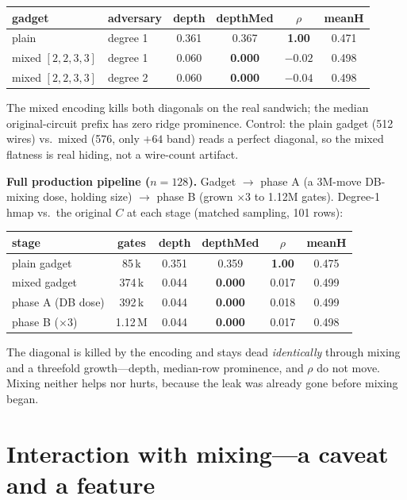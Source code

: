 \documentclass[11pt]{article}
\begin{document}
\begin{center}
\begin{tabular}{llcccc}
\toprule
gadget & adversary & depth & depthMed & $\rho$ & meanH \\
\midrule
plain & degree 1 & 0.361 & 0.367 & \textbf{1.00} & 0.471 \\
mixed $[2,2,3,3]$ & degree 1 & 0.060 & \textbf{0.000} & \textbf{$-0.02$} & 0.498 \\
mixed $[2,2,3,3]$ & degree 2 & 0.060 & \textbf{0.000} & \textbf{$-0.04$} & 0.498 \\
\bottomrule
\end{tabular}
\end{center}

\noindent The mixed encoding kills both diagonals on the real sandwich; the
median original-circuit prefix has zero ridge prominence. Control: the plain
gadget (512 wires) vs.\ mixed (576, only $+64$ band) reads a perfect diagonal, so
the mixed flatness is real hiding, not a wire-count artifact.

\textbf{Full production pipeline ($n=128$).} Gadget $\to$ phase A (a 3M-move
DB-mixing dose, holding size) $\to$ phase B (grown $\times3$ to 1.12M gates).
Degree-1 hmap vs.\ the original $C$ at each stage (matched sampling, 101 rows):

\begin{center}
\begin{tabular}{lccccc}
\toprule
stage & gates & depth & depthMed & $\rho$ & meanH \\
\midrule
plain gadget & 85\,k & 0.351 & 0.359 & \textbf{1.00} & 0.475 \\
mixed gadget & 374\,k & 0.044 & \textbf{0.000} & 0.017 & 0.499 \\
phase A (DB dose) & 392\,k & 0.044 & \textbf{0.000} & 0.018 & 0.499 \\
phase B ($\times3$) & 1.12\,M & 0.044 & \textbf{0.000} & 0.017 & 0.498 \\
\bottomrule
\end{tabular}
\end{center}

\noindent The diagonal is killed by the encoding and stays dead
\emph{identically} through mixing and a threefold growth---depth, median-row
prominence, and $\rho$ do not move. Mixing neither helps nor hurts, because the
leak was already gone before mixing began.

\section{Interaction with mixing---a caveat and a feature}\label{sec:mixing}
\end{document}
